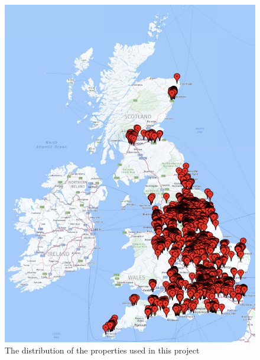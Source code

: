 \documentclass[12pt,twoside]{report}
\begin{document}
\begin{figure}[!htbp]
	\centering
	\includegraphics[width=\linewidth]{uk_distribution}
	\caption{The distribution of the properties used in this project}
	\label{uk_distribution}
\end{figure}



\end{document}
